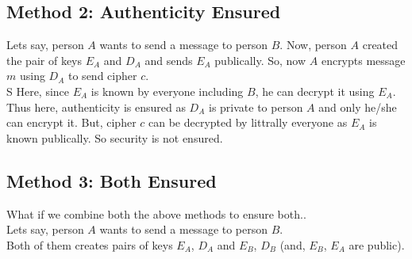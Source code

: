 \documentclass[english, 11pt]{article}
\begin{document}
\subsection*{Method 2: Authenticity Ensured}
Lets say, person $A$ wants to send a message to person $B$. Now, person $A$ created the pair of keys $E_A$ and $D_A$ and sends $E_A$ publically.
So, now $A$ encrypts message $m$ using $D_A$ to send cipher $c$.\\S
Here, since $E_A$ is known by everyone including $B$, he can decrypt it using $E_A$. Thus here, authenticity is ensured as $D_A$ is private to person $A$ and only he/she can encrypt it. But, cipher $c$ can be decrypted by littrally everyone as $E_A$ is known publically. So security is not ensured.

\begin{figure}[ht]


  \centering   
\end{figure}

\subsection*{Method 3: Both Ensured}
What if we combine both the above methods to ensure both..\\
Lets say, person $A$ wants to send a message to person $B$.\\
Both of them creates pairs of keys $E_A$, $D_A$ and $E_B$, $D_B$ (and, $E_B$, $E_A$ are public).
\end{document}
